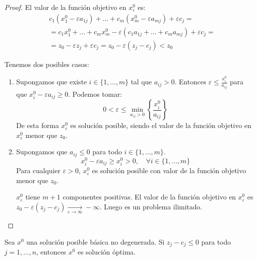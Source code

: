 \begin{proof}
    El valor de la función objetivo en $x^0_\varepsilon$ es:
    \begin{align*}
         & c_1(x^0_1 - \varepsilon a_{1j}) + \dots + c_m(x^0_m - \varepsilon a_{mj}) + \varepsilon c_j =  \\
         & = c_1x^0_1 + \dots + c_mx^0_m - \varepsilon(c_1a_{1j} + \dots + c_ma_{mj}) + \varepsilon c_j = \\
         & = z_0 - \varepsilon z_j + \varepsilon c_j = z_0 - \varepsilon(z_j - c_j) < z_0
    \end{align*}

    Tenemos dos posibles casos:
    \begin{enumerate}
        \item Supongamos que existe $i \in \{1, \dots, m\}$ tal que $a_{ij} > 0$.
              Entonces $\varepsilon \leq \frac{x^0_i}{a_{ij}}$ para que $x^0_i - \varepsilon a_{ij} \geq 0$.
              Podemos tomar:
              $$0 < \varepsilon \leq \min_{a_{ij} > 0} \left\{\frac{x^0_i}{a_{ij}}\right\}$$
              De esta forma $x^0_\varepsilon$ es solución posible, siendo el valor de la función objetivo en $x^0_\varepsilon$ menor que $z_0$.
        \item Supongamos que $a_{ij} \leq 0$ para todo $i \in \{1, \dots, m\}$.
              $$x^0_i - \varepsilon a_{ij} \geq x^0_i > 0, \quad \forall i \in \{1, \dots, m\}$$
              Para cualquier $\varepsilon > 0$, $x^0_\varepsilon$ es solución posible con valor de la función objetivo menor que $z_0$.

              $x^0_\varepsilon$ tiene $m+1$ componentes positivas.
              El valor de la función objetivo en $x^0_\varepsilon$ es $z_0 - \varepsilon(z_j - c_j) \xrightarrow[\varepsilon \to \infty]{} -\infty$.
              Luego es un problema ilimitado.
    \end{enumerate}
\end{proof}

\begin{theorem}
    Sea $x^0$ una solución posible básica no degenerada.
    Si $z_j - c_j \leq 0$ para todo $j = 1, \dots, n$, entonces $x^0$ es solución óptima.
\end{theorem}


